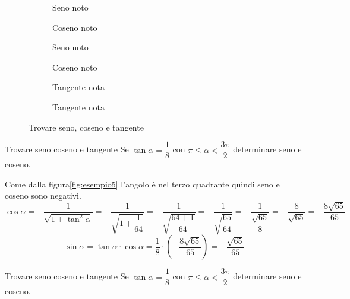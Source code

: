 \begin{figure}
\begin{subfigure}[b]{.5\linewidth}
\centering

\captionsetup{format=esempio}
\caption{Seno noto}\label{fig:esempio1}
\end{subfigure}%
\begin{subfigure}[b]{.5\linewidth}
\centering

\captionsetup{format=esempio}
\caption{Coseno noto}\label{fig:esempio2}
\end{subfigure}%
\quad
\begin{subfigure}[b]{.5\linewidth}
\centering

\captionsetup{format=esempio}
\caption{Seno noto}\label{fig:esempio3}
\end{subfigure}%
\begin{subfigure}[b]{.5\linewidth}
\centering

\captionsetup{format=esempio}
\caption{Coseno noto}\label{fig:esempio4}
\end{subfigure}%
\quad
\begin{subfigure}[b]{.5\linewidth}
	\centering
	
	\caption{Tangente nota}\label{fig:esempio5}
\end{subfigure}%
\begin{subfigure}[b]{.5\linewidth}
	\centering
	
	\caption{Tangente nota}\label{fig:esempio6}
\end{subfigure}%
\caption{Trovare seno, coseno e tangente}
\end{figure}
\begin{esempiot}{Trovare seno coseno e tangente}{}
Se $\tan\alpha=\dfrac{1}{8}$ con $\pi\leq\alpha<\dfrac{3\pi}{2}$ determinare seno e coseno.
\end{esempiot}
Come dalla figura\nobs\vref{fig:esempio5} l'angolo è nel terzo quadrante quindi seno e coseno sono negativi.
\[\cos\alpha=-\dfrac{1}{\sqrt{1+\tan^2\alpha}}=-\dfrac{1}{\sqrt{1+\dfrac{1}{64}}}=-\dfrac{1}{\sqrt{\dfrac{64+1}{64}}}=-\dfrac{1}{\sqrt{\dfrac{65}{64}}}=-\dfrac{1}{\dfrac{\sqrt{65}}{8}}=-\dfrac{8}{\sqrt{65}}=-\dfrac{8\sqrt{65}}{65} \]
\[\sin\alpha=\tan\alpha\cdot\cos\alpha=\dfrac{1}{8}\cdot\left(-\dfrac{8\sqrt{65}}{65}\right)=-\dfrac{\sqrt{65}}{65} \]
\begin{esempiot}{Trovare seno coseno e tangente}{}
	Se $\tan\alpha=\dfrac{1}{8}$ con $\pi\leq\alpha<\dfrac{3\pi}{2}$ determinare seno e coseno.
\end{esempiot}

